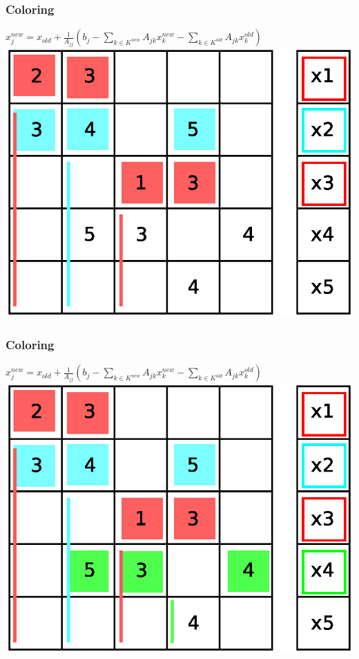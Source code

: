 \documentclass{beamer}
\begin{document}
\begin{frame}
\frametitle{Coloring}
$ x_j^{new} = x_{old} + \frac{1}{A_{jj}} \left(b_{j} - \sum_{k \in K^{new}}A_{jk}
 x_k^{new} - \sum_{k \in K^{old}}A_{jk} x_k^{old}\right)$
\includegraphics[width=0.8\linewidth]{graphic/coloringGS8.eps}
\end{frame}

\begin{frame}
\frametitle{Coloring}
$ x_j^{new} = x_{old} + \frac{1}{A_{jj}} \left(b_{j} - \sum_{k \in K^{new}}A_{jk}
 x_k^{new} - \sum_{k \in K^{old}}A_{jk} x_k^{old}\right)$
\includegraphics[width=0.8\linewidth]{graphic/coloringGS9.eps}
\end{frame}
\end{document}
